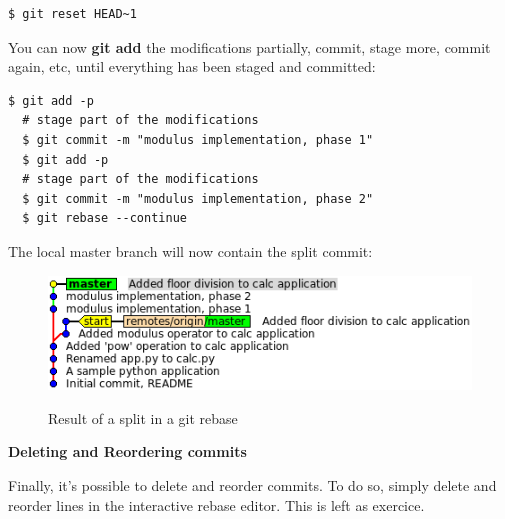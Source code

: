 \documentclass{../common/tufte-latex/tufte-handout}
\begin{document}
\begin{lstlisting}[style=BashInputStyle]
  $ git reset HEAD~1
\end{lstlisting}

You can now \textbf{git add} the modifications partially, commit, stage more, commit again, etc, until everything has been staged and committed:

\begin{lstlisting}[style=BashInputStyle]
  $ git add -p
  # stage part of the modifications
  $ git commit -m "modulus implementation, phase 1"
  $ git add -p
  # stage part of the modifications
  $ git commit -m "modulus implementation, phase 2"
  $ git rebase --continue
\end{lstlisting}

The local master branch will now contain the split commit:

\begin{figure}%
  \centering
  \includegraphics[width=0.75\linewidth]{gitrebase-split.png}
  \label{fig:gitrebase-split}
  \caption{Result of a split in a git rebase}
\end{figure}

\noindent \textbf{Deleting and Reordering commits}

Finally, it's possible to delete and reorder commits.
To do so, simply delete and reorder lines in the interactive rebase editor.
This is left as exercice.



\end{document}

